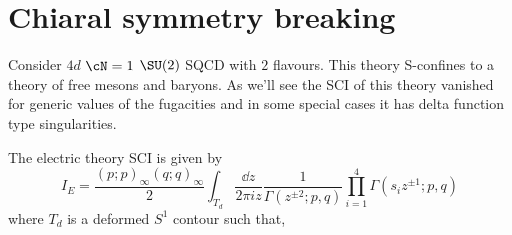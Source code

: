 \section{Chiaral symmetry breaking}
Consider $4d$ $\cN=1$ $\SU(2)$ SQCD with $2$ flavours. This theory S-confines to a theory of free mesons and baryons. As we'll see the SCI of this theory vanished for generic values of the fugacities and in some special cases it has delta function type singularities.

The electric theory SCI is given by
\begin{equation}
	I_{E}=\frac{(p;p)_{\infty}(q;q)_{\infty}}{2}\int_{T_{d}}\frac{\dd{z}}{2\pi i z}\frac{1}{\Gamma(z^{\pm2};p,q)}\prod_{i=1}^{4}\Gamma( s_{i}z^{\pm 1};p,q)
\end{equation}
where $T_{d}$ is a deformed $S^{1}$ contour such that, 

